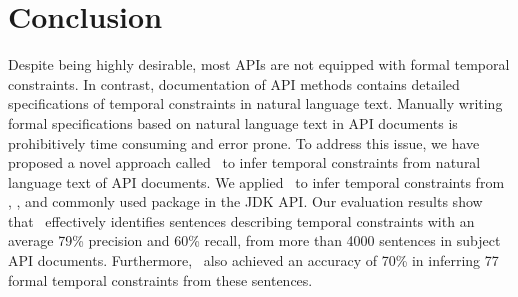 \section{Conclusion}
\label{sec:conclusion}

Despite being highly desirable, most APIs are not equipped with formal temporal constraints.
In contrast, documentation of API methods contains detailed specifications of temporal constraints in natural language text.
Manually writing formal specifications based on natural language text in API documents is prohibitively time consuming and error prone.
To address this issue, we have proposed a novel approach called \tool\ to infer temporal constraints from natural language text of API documents.
We applied \tool\ to infer temporal constraints from
\paypalAPI, \amazonAPI, and  
commonly used package  in the JDK API.
Our evaluation results show that \tool\ effectively identifies sentences describing
temporal constraints with an average 79\% precision and 60\% recall,
from more than 4000 sentences in subject API documents.
Furthermore, \tool\ also achieved an accuracy of
70\% in inferring 77 formal temporal constraints from these sentences.